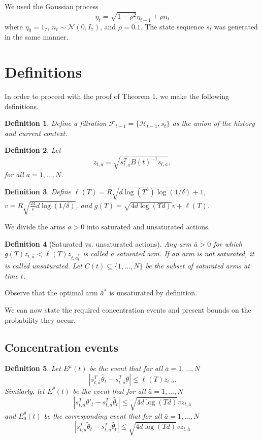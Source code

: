 \documentclass{article}
\newtheorem{definition}{Definition}
\begin{document}
\begin{appendices}
We used the Gaussian process
\[
\eta_t = \sqrt{1-\rho^2}\eta_{t-1} + \rho n_t
\]
where $\eta_0 = 1_7$, $n_t \sim \mathcal{N}(0, I_7)$, and $\rho = 0.1$. The state sequence $\bar{s}_t$ was generated in the same manner. 



\section{Definitions}
In order to proceed with the proof of Theorem 1, we make the following definitions. 

\begin{definition}

Define a filtration $\mathcal{F}_{t-1} = \{\mathcal{H}_{t-1}, \bar{s}_{t}\}$ as the union of the history and current context.
\end{definition}
\begin{definition}
Let
\[
z_{t,a} = \sqrt{s_{t,a}^T B(t)^{-1} s_{t,a}},
\]
for all $a = 1,\dots, N$. 
\end{definition}
\begin{definition}
Define $\ell(T) = R\sqrt{d \log (T^3) \log (1/\delta)} + 1$, $v = R\sqrt{\frac{24}{\epsilon} d \log(1/\delta)}$, and $g(T) = \sqrt{4d \log(Td)} v + \ell(T)$. 
\end{definition}
We divide the arms $\bar{a} > 0$ into saturated and unsaturated actions. 
\begin{definition}[Saturated vs. unsaturated actions]
Any arm $\bar{a}>0$ for which $g(T) z_{t,\bar{a}} < \ell(T) z_{t,\bar{a}^*_t}$ is called a \emph{saturated arm}. If an arm is not saturated, it is called \emph{unsaturated}. Let $C(t) \subseteq \{1,\dots,N\}$ be the subset of saturated arms at time $t$. 
\end{definition}
Observe that the optimal arm $\bar{a}^*$ is unsaturated by definition.

We can now state the required concentration events and present bounds on the probability they occur.
\subsection{Concentration events}

\begin{definition}
Let $E^\mu(t)$ be the event that for all $\bar{a} = 1 ,\dots, N$
\[
|s_{t,\bar{a}}^T\hat{\theta}_t - s_{t,\bar{a}}^T \theta| \leq \ell(T) z_{t,\bar{a}}.
\]
Similarly, let $E^\theta(t)$ be the event that for all $\bar{a} = 1,\dots, N$
\[
|s_{t,\bar{a}}^T\theta'_t - s_{t,\bar{a}}^T\hat{\theta}_t| \leq \sqrt{4d\log(Td)} v z_{t,\bar{a}}
\]
and $E^\theta_0(t)$ be the corresponding event that for all $\bar{a} = 1,\dots, N$
\[
|s_{t,\bar{a}}^T\tilde{\theta}_t - s_{t,\bar{a}}^T\hat{\theta}_t| \leq \sqrt{4d\log(Td)} v z_{t,\bar{a}}
\]
\end{definition}



\end{appendices}
\end{document}
